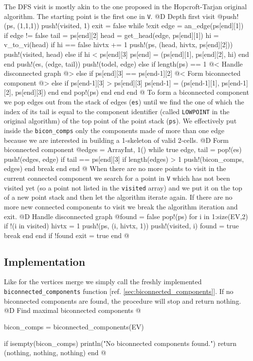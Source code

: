 The DFS visit is mostly akin to the one proposed in the Hopcroft-Tarjan original algorithm.
The starting point is the first one in \texttt{V}.
@D Depth first visit
@{push!(ps, (1,1,1))
push!(visited, 1)
exit = false
while !exit
    edge = an_edge(ps[end][1])
    if edge != false
        tail = ps[end][2]
        head = get_head(edge, ps[end][1])
        hi = v_to_vi(head)
        if hi == false
            hivtx += 1
            push!(ps, (head, hivtx, ps[end][2]))
            push!(visited, head)
        else
            if hi < ps[end][3]
                ps[end] = (ps[end][1], ps[end][2], hi)
            end
        end
        push!(es, (edge, tail))
        push!(todel, edge)
    else
        if length(ps) == 1
            @< Handle disconnected graph @>
        else
            if ps[end][3] == ps[end-1][2]
                @< Form biconnected component @>
            else
                if ps[end-1][3] > ps[end][3]
                    ps[end-1] = (ps[end-1][1], ps[end-1][2], ps[end][3])
                end
            end
            pop!(ps)
        end
    end
end
@}
To form a biconnected component we pop edges out from the stack of edges (\texttt{es}) until we find the one
of which the index of its tail is equal to the component identifier (called \texttt{LOWPOINT} in the original algorithm) 
of the top point of the point stack (\texttt{ps}). We effectively put inside the \texttt{bicon\_comps} only the components
made of more than one edge because we are interested in building a 1-skeleton of valid 2-cells.
@D Form biconnected component
@{edges = Array{Int, 1}()
while true
    edge, tail = pop!(es)
    push!(edges, edge)
    if tail == ps[end][3]
        if length(edges) > 1
            push!(bicon_comps, edges)
        end
        break
    end
end
@}
When there are no more points to visit in the current connected component we search for a point in \texttt{V}
which has not been visited yet (so a point not listed in the \texttt{visited} array) and we put it on the top
of a new point stack and then let the algorithm iterate again. If there are no more new connected components 
to visit we break the algorithm iteration and exit.
@D Handle disconnected graph
@{found = false
pop!(ps)
for i in 1:size(EV,2)
    if !(i in visited)
        hivtx = 1
        push!(ps, (i, hivtx, 1))
        push!(visited, i)
        found = true
        break
    end
end
if !found
    exit = true
end
@}
\subsection{Implementation}
Like for the vertices merge we simply call the freshly implemented \texttt{biconnected\_components} function
[ref. \ref{sec:biconnected_components}]. If no biconnected components are found, the procedure will stop and return nothing.
@D Find maximal biconnected components
@{bicon_comps = biconnected_components(EV)

if isempty(bicon_comps)
    println("No biconnected components found.")
    return (nothing, nothing, nothing)
end
@}

